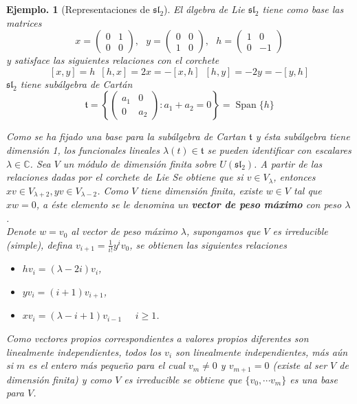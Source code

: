 \documentclass[11pt,a4paper]{article}
\newtheorem{example}{Ejemplo.}
\newcommand{\Span}{\operatorname{Span}}
\begin{document}
\begin{example}[Representaciones de $\mathfrak{sl}_2$]
El álgebra de Lie $\mathfrak{sl}_2$ tiene como base las matrices
$$x=\begin{pmatrix}0 & 1 \\
0 & 0\end{pmatrix}, \, \, \, \,y=\begin{pmatrix}0 & 0 \\
1 & 0\end{pmatrix}, \, \, \, \, h=\begin{pmatrix}1 & 0 \\
0 & -1\end{pmatrix}  $$
y satisface las siguientes relaciones con el corchete
$$[x,y]=h \, \, \, [h,x]=2x=-[x,h] \, \, \, [h,y]=-2y=-[y,h] $$
$\mathfrak{sl}_2$ tiene subálgebra de Cartán 
$$\mathfrak{t}= \left\lbrace \begin{pmatrix}a_1 & 0 \\
0 & a_2 \end{pmatrix} : a_1 + a_2=0 \right\rbrace=\Span \{h\}  $$

Como se ha fijado una base para la subálgebra de Cartan $\mathfrak{t}$ y ésta subálgebra tiene dimensión 1, los funcionales lineales $\lambda(t)\in \mathfrak{t}$ se pueden identificar  con escalares $\lambda \in \mathbb{C}$.
Sea $V$ un módulo de dimensión finita  sobre $U(\mathfrak{sl}_2)$. A partir de las relaciones dadas por el corchete de Lie Se obtiene que si $v\in V_{\lambda}$, entonces $xv\in V_{\lambda+2}, yv \in V_{\lambda-2}$. Como $V$ tiene dimensión finita, existe $w\in V$ tal que $xw=0$, a éste elemento se le denomina un \textbf{vector de peso máximo} con peso $\lambda$. \\

Denote $w=v_0$ al vector de peso máximo $\lambda$, supongamos que $V$ es irreducible (simple), defina $v_{i+1}=\frac{1}{i!}y^i v_0$, se obtienen las siguientes relaciones
\begin{itemize}
    \item $hv_i=(\lambda-2i)v_i$,
    \item $yv_i=(i+1)v_{i+1}$, 
    \item $xv_i= (\lambda-i +1) v_{i-1}$ \, \, $i\geq1$.
\end{itemize}
Como vectores propios correspondientes a valores propios diferentes son linealmente independientes, todos los $v_i$ son linealmente independientes, más aún si $m$ es el entero más pequeño para el cual $v_m \neq 0$ y $v_{m+1}=0$ (existe al ser $V$ de dimensión finita) y como $V$ es irreducible   se obtiene que $\{v_0, \cdots v_m\}$ es una base para $V$. \\


\end{example}
\end{document}
